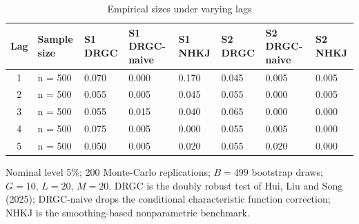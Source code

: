 \begin{table}[htbp]
\centering
\caption{Empirical sizes under varying lags}
\label{tab:size}
\small
\begin{tabular}{clllllll}
\toprule
Lag & Sample size & S1 DRGC & S1 DRGC-naive & S1 NHKJ & S2 DRGC & S2 DRGC-naive & S2 NHKJ \\
\midrule
1 & n = 500 & 0.070 & 0.000 & 0.170 & 0.045 & 0.005 & 0.005 \\
2 & n = 500 & 0.055 & 0.005 & 0.045 & 0.055 & 0.000 & 0.005 \\
3 & n = 500 & 0.055 & 0.015 & 0.040 & 0.065 & 0.000 & 0.000 \\
4 & n = 500 & 0.075 & 0.005 & 0.000 & 0.055 & 0.005 & 0.000 \\
5 & n = 500 & 0.050 & 0.005 & 0.020 & 0.055 & 0.020 & 0.000 \\
\bottomrule
\end{tabular}

\begin{minipage}{\linewidth}\footnotesize
Nominal level 5\%; 200 Monte-Carlo replications; $B=499$ bootstrap draws; $G=10$, $L=20$, $M=20$.  DRGC is the doubly robust test of Hui, Liu and Song (2025); DRGC-naive drops the conditional characteristic function correction; NHKJ is the smoothing-based nonparametric benchmark.
\end{minipage}
\end{table}
